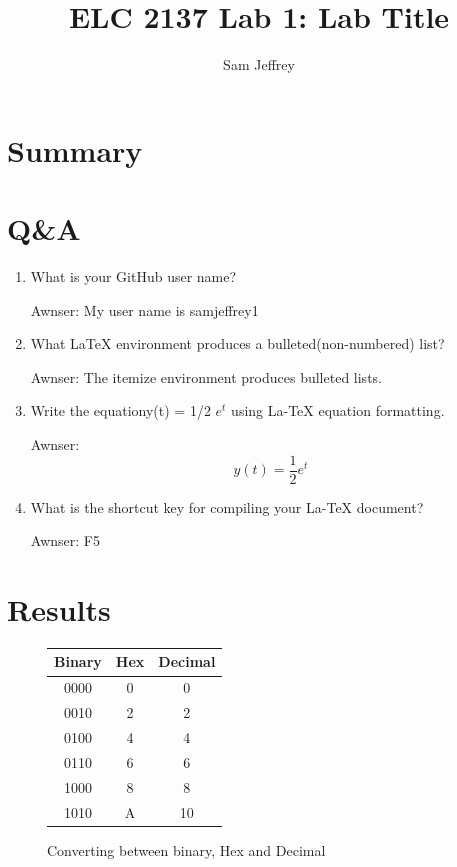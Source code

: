 \documentclass[11pt]{article}
\begin{document}
\title{ELC 2137 Lab 1: Lab Title}
\author{Sam Jeffrey}

\maketitle


\section*{Summary}



\section*{Q\&A}


\begin{enumerate}
\item  What is your GitHub user name?
 
Awnser: My user name is samjeffrey1

\item  What  LaTeX  environment  produces  a  bulleted(non-numbered) list?

Awnser: The itemize environment produces bulleted lists.

\item  Write  the  equationy(t) = 1/2 $e^t$ using  La-TeX equation formatting.

Awnser: 
\begin{equation}
	y(t) = \frac{1}{2}e^t
\end{equation}

\item  What is the shortcut key for compiling your La-TeX document?

Awnser: F5

\end{enumerate}


\section*{Results}


\begin{figure}[ht]\centering
	\begin{tabular}{c|c|c}
		\toprule
		Binary & Hex & Decimal \\
		\midrule
		0000 & 0 & 0 \\
		0010 & 2 & 2 \\
		0100 & 4 & 4 \\
		0110 & 6 & 6 \\
		1000 & 8 & 8 \\
		1010 & A & 10 \\
		\bottomrule
	\end{tabular} 
	\caption{Converting between binary, Hex and Decimal}
\label{tbl:example_table}
\end{figure}
\end{document}
